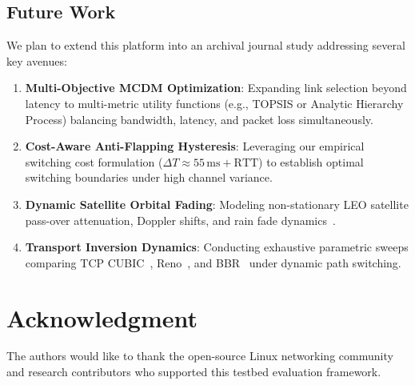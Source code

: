 \documentclass[conference]{IEEEtran}
\begin{document}
\subsection{Future Work}
We plan to extend this platform into an archival journal study addressing several key avenues:
\begin{enumerate}
    \item \textbf{Multi-Objective MCDM Optimization}: Expanding link selection beyond latency to multi-metric utility functions (e.g., TOPSIS or Analytic Hierarchy Process) balancing bandwidth, latency, and packet loss simultaneously.
    \item \textbf{Cost-Aware Anti-Flapping Hysteresis}: Leveraging our empirical switching cost formulation ($\Delta T \approx 55\,\text{ms} + \text{RTT}$) to establish optimal switching boundaries under high channel variance.
    \item \textbf{Dynamic Satellite Orbital Fading}: Modeling non-stationary LEO satellite pass-over attenuation, Doppler shifts, and rain fade dynamics~\cite{handley2017rethinking}.
    \item \textbf{Transport Inversion Dynamics}: Conducting exhaustive parametric sweeps comparing TCP CUBIC~\cite{ha2008cubic}, Reno~\cite{jacobson1988congestion}, and BBR~\cite{cardwell2016bbr} under dynamic path switching.
\end{enumerate}

\section*{Acknowledgment}
The authors would like to thank the open-source Linux networking community and research contributors who supported this testbed evaluation framework.



\end{document}
